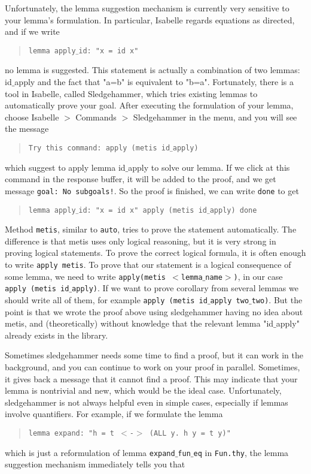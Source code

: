 \documentclass[11pt]{article}
\newcommand{\prog}[1]{\par\noindent\begin{quote}#1\end{quote}\par\noindent}
\begin{document}
Unfortunately, the lemma suggestion mechanism is currently very sensitive to your lemma's formulation. In particular, Isabelle regards equations as directed, and if we write

\prog{\tt lemma apply$\_$id: "x = id x"}%
no lemma is suggested. This statement is actually a combination of two lemmas: id$\_$apply and the fact that "a=b" is equivalent to "b=a". Fortunately, there is a tool in Isabelle, called Sledgehammer, which tries existing lemmas to automatically prove your goal. After executing the formulation of your lemma, choose Isabelle $>$ Commands $>$ Sledgehammer in the menu, and you will see the message

\prog{\tt Try this command: apply (metis id$\_$apply)}%
which suggest to apply lemma id$\_$apply to solve our lemma. If we click at this command in the response buffer, it will be added to the proof, and we get message {\tt goal:~No subgoals!}. So the proof is finished, we can write {\tt done} to get

\prog{\tt lemma apply$\_$id: "x = id x" apply (metis id$\_$apply) done}%

Method {\tt metis}, similar to {\tt auto}, tries to prove the statement automatically. The difference is that metis uses only logical reasoning, but it is very strong in proving logical statements. To prove the correct logical formula, it is often enough to write {\tt apply metis}. To prove that our statement is a logical consequence of some lemma, we need to write {\tt apply(metis $<$lemma$\_$name$>$)}, in our case {\tt apply (metis id$\_$apply)}. If we want to prove corollary from several lemmas we should write all of them, for example {\tt apply (metis id$\_$apply two$\_$two)}. But the point is that we wrote the proof above using sledgehammer having no idea about metis, and (theoretically) without knowledge that the relevant lemma "id$\_$apply" already exists in the library.

Sometimes sledgehammer needs some time to find a proof, but it can work in the background, and you can continue to work on your proof in parallel. Sometimes, it gives back a message that it cannot find a proof. This may indicate that your lemma is nontrivial and new, which would be the ideal case. Unfortunately, sledgehammer is not always helpful even in simple cases, especially if lemmas involve quantifiers. For example, if we formulate the lemma

\prog{\tt lemma expand: "h = t $<$-$>$ (ALL y. h y = t y)"}%
which is just a reformulation of lemma {\tt expand$\_$fun$\_$eq} in {\tt Fun.thy}, the lemma suggestion mechanism immediately tells you that
\end{document}
